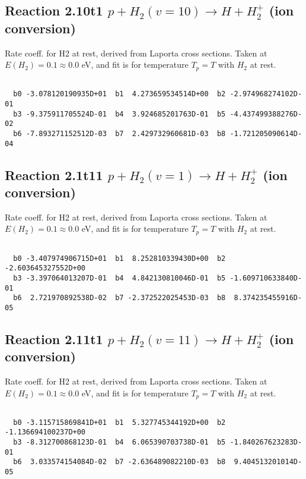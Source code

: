 \documentclass[12pt,dvipdfmx]{article}
\begin{document}
\newpage
\subsection{
Reaction 2.10t1
$ p + H_2(v=10) \rightarrow H + H_2^+$ (ion conversion)
}
Rate coeff. for H2 at rest, derived from Laporta cross sections.
Taken at $E(H_2) = 0.1 \approx 0.0$ eV,  and fit is for temperature $T_p=T$ with $H_2$ at rest.

\begin{small}\begin{verbatim}

  b0 -3.078120190935D+01  b1  4.273659534514D+00  b2 -2.974968274102D-01
  b3 -9.375911705524D-01  b4  3.924685201763D-01  b5 -4.437499388276D-02
  b6 -7.893271152512D-03  b7  2.429732960681D-03  b8 -1.721205090614D-04

\end{verbatim}\end{small}

\newpage
\subsection{
Reaction 2.1t11
$ p + H_2(v=1) \rightarrow H + H_2^+$ (ion conversion)
}
Rate coeff. for H2 at rest, derived from Laporta cross sections.
Taken at $E(H_2) = 0.1 \approx 0.0$ eV,  and fit is for temperature $T_p=T$ with $H_2$ at rest.

\begin{small}\begin{verbatim}

  b0 -3.407974906715D+01  b1  8.252810339430D+00  b2 -2.603645327552D+00
  b3 -3.397064013207D-01  b4  4.842130810046D-01  b5 -1.609710633840D-01
  b6  2.721970892538D-02  b7 -2.372522025453D-03  b8  8.374235455916D-05

\end{verbatim}\end{small}

\newpage
\subsection{
Reaction 2.11t1
$ p + H_2(v=11) \rightarrow H + H_2^+$ (ion conversion)
}
Rate coeff. for H2 at rest, derived from Laporta cross sections.
Taken at $E(H_2) = 0.1 \approx 0.0$ eV,  and fit is for temperature $T_p=T$ with $H_2$ at rest.

\begin{small}\begin{verbatim}

  b0 -3.115715869841D+01  b1  5.327745344192D+00  b2 -1.136694100237D+00
  b3 -8.312700868123D-01  b4  6.065390703738D-01  b5 -1.840267623283D-01
  b6  3.033574154084D-02  b7 -2.636489082210D-03  b8  9.404513201014D-05

\end{verbatim}\end{small}
\end{document}
